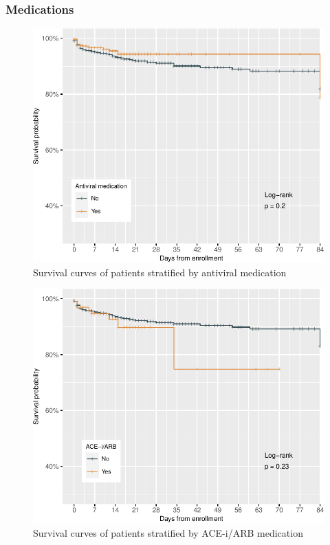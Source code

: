\documentclass[
  10pt,
]{article}
\begin{document}
\newpage

\hypertarget{medications}{%
\subsubsection{Medications}\label{medications}}

\begin{figure}[h]

{\centering \includegraphics{results_files/figure-latex/antiviral-1} 

}

\caption{Survival curves of patients stratified by antiviral medication}\label{fig:antiviral}
\end{figure}

\newpage

\begin{figure}[h]

{\centering \includegraphics{results_files/figure-latex/ace-inhibitors-1} 

}

\caption{Survival curves of patients stratified by ACE-i/ARB medication}\label{fig:ace-inhibitors}
\end{figure}
\end{document}
